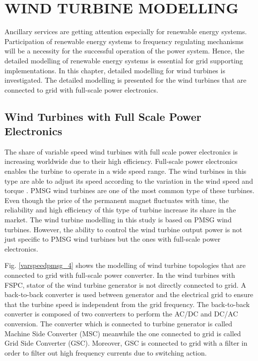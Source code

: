 \chapter{WIND TURBINE MODELLING}
\label{chp:3}
Ancillary services are getting attention especially for renewable energy systems. Participation of renewable energy systems to frequency regulating mechanisms will be a necessity for the successful operation of the power system. Hence, the detailed modelling of renewable energy systems is essential for grid supporting implementations. In this chapter, detailed modelling for wind turbines is investigated. The detailed modelling is presented for the wind turbines that are connected to grid with full-scale power electronics. 
\section{Wind Turbines with Full Scale Power Electronics}
The share of variable speed wind turbines with full scale power electronics is increasing worldwide due to their high efficiency. Full-scale power electronics enables the turbine to operate in a wide speed range. The wind turbines in this type are able to adjust its speed according to the variation in the wind speed and torque \cite{Chen2009b}. PMSG wind turbines are one of the most common type of these turbines. Even though the price of the permanent magnet fluctuates with time, the reliability and high efficiency of this type of turbine increase its share in the market. The wind turbine modelling in this study is based on PMSG wind turbines. However, the ability to control the wind turbine output power is not just specific to PMSG wind turbines but the ones with full-scale power electronics. \par
Fig. \ref{varspeedpmsg_4} shows the modelling of wind turbine topologies that are connected to grid with full-scale power converter. In the wind turbines with FSPC, stator of the wind turbine generator is not directly connected to grid. A back-to-back converter is used between generator and the electrical grid to ensure that the turbine speed is independent from the grid frequency. The back-to-back converter is composed of two converters to perform the AC/DC and DC/AC conversion. The converter which is connected to turbine generator is called Machine Side Converter (MSC) meanwhile the one connected to grid is called Grid Side Converter (GSC). Moreover, GSC is connected to grid with a filter in order to filter out high frequency currents due to switching action. \par
